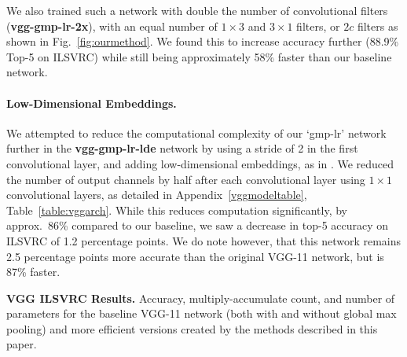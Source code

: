 \documentclass[thesis]{subfiles}
\begin{document}
    We also trained such a network with double the number of convolutional filters (\textbf{vgg-gmp-lr-2x}), \ie with an equal number of $1 \times 3$ and $3 \times 1$ filters, or $2c$ filters as shown in Fig.~\ref{fig:ourmethod}. We found this to increase accuracy further (88.9\% Top-5 on ILSVRC) while still being approximately 58\% faster than our baseline network.
    
    \paragraph{Low-Dimensional Embeddings.}
    We attempted to reduce the computational complexity of our `gmp-lr' network further in the \textbf{vgg-gmp-lr-lde} network by using a stride of 2 in the first convolutional layer, and adding low-dimensional embeddings, as in \citet{Lin2014,Szegedy2014going}. We reduced the number of output channels by half after each convolutional layer using $1 \times 1$ convolutional layers, as detailed in Appendix~\ref{vggmodeltable}, Table~\ref{table:vggarch}. While this reduces computation significantly, by approx.~86\% compared to our baseline, we saw a decrease in top-5 accuracy on ILSVRC of 1.2 percentage points. We do note however, that this network remains 2.5 percentage points more accurate than the original VGG-11 network, but is 87\% faster.
    
    \begin{table}[tbp]
        \caption[VGG ILSVRC Results]{{\bf VGG ILSVRC Results.} Accuracy, multiply-accumulate count, and number of parameters for the baseline VGG-11 network (both with and without global max pooling) and more efficient versions created by the methods described in this paper.}
        
        \data
        
		\tabcolsep=5pt
        \pgfplotstabletypeset[
        every head row/.style={
            before row=\toprule,after row=\midrule},
        every last row/.style={
            after row=\bottomrule},
        every first row/.style={
            after row=\bottomrule},
        fixed zerofill,     %
        columns={Network, Stride, Multiply-Acc., Param., Top-1 Acc., Top-5 Acc.},
        column type/.add={lrrrrrr}{},
        columns/Multiply-Acc./.style={
            column name=Multiple-Acc. {\small $\times 10^{9}$},
            preproc/expr={{##1/1e9}}
        },
        columns/Param./.style={
            column name=Param. {\small $\times 10^{7}$},
            preproc/expr={{##1/1e7}}
        },
        columns/Network/.style={string type},
        columns/Stride/.style={precision=0},
        columns/Top-1 Acc./.style={precision=3},
        columns/Top-5 Acc./.style={precision=3},
        highlight col max ={\data}{Top-1 Acc.},
        highlight col max ={\data}{Top-5 Acc.},
        highlight col min ={\data}{Param.},
        highlight col min ={\data}{Multiply-Acc.},
        col sep=comma]{\data}
        \label{table:vggimagenetresults}
    \end{table}
    
\end{document}
